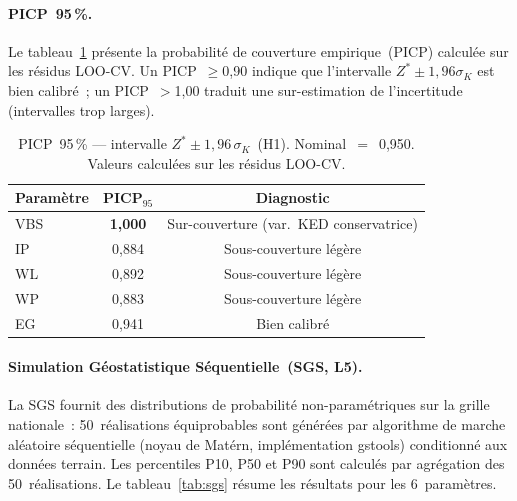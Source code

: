 \documentclass[10pt,a4paper,twocolumn]{article}
\begin{document}
	\paragraph{PICP~95\,\%.}
	Le tableau~\ref{tab:picp} présente la probabilité de couverture
	empirique~(PICP) calculée sur les résidus LOO-CV.
	Un PICP~$\geq$0{,}90 indique que l'intervalle $Z^*\pm1{,}96\sigma_K$
	est bien calibré~; un PICP~$>$1{,}00 traduit une sur-estimation
	de l'incertitude (intervalles trop larges).

	\begin{table}[htbp]
		\centering\small
		\caption{PICP~95\,\% --- intervalle $Z^*\pm1{,}96\,\sigma_K$~(H1).
			Nominal~$=$~0{,}950. Valeurs calculées sur les résidus LOO-CV.}
		\label{tab:picp}
		\begin{tabular}{lcc}
			\toprule
			Paramètre & PICP$_{95}$ & Diagnostic \\
			\midrule
			VBS & \textbf{1{,}000} & Sur-couverture (var.~KED conservatrice) \\
			IP  & 0{,}884 & Sous-couverture légère \\
			WL  & 0{,}892 & Sous-couverture légère \\
			WP  & 0{,}883 & Sous-couverture légère \\
			EG  & 0{,}941 & Bien calibré \\
			\bottomrule
		\end{tabular}
	\end{table}

	\paragraph{Simulation Géostatistique Séquentielle~(SGS, L5).}
	La SGS fournit des distributions de probabilité non-paramétriques
	sur la grille nationale~: 50~réalisations équiprobables sont
	générées par algorithme de marche aléatoire séquentielle
	(noyau de Matérn, implémentation gstools) conditionné aux données terrain.
	Les percentiles P10, P50 et P90 sont calculés par agrégation
	des 50~réalisations.
	Le tableau~\ref{tab:sgs} résume les résultats pour les 6~paramètres.
\end{document}
